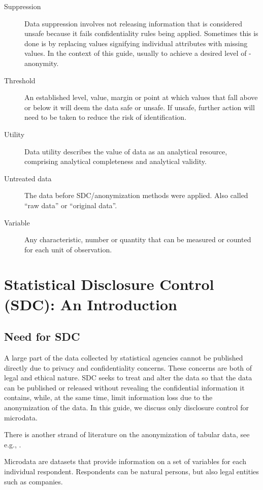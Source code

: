 \documentclass[letterpaper,10pt,english]{sphinxmanual}
\begin{document}
\begin{description}
\item[{Suppression}] \leavevmode
Data suppression involves not  releasing information that is  considered unsafe because it
fails confidentiality rules being applied. Sometimes this is done   is by replacing values
signifying individual attributes with missing values. In the context of this guide,
usually to achieve a  desired level of - anonymity.

\item[{Threshold}] \leavevmode
An established level, value,   margin or point at which values   that fall above or
below it will  deem the data safe or unsafe. If  unsafe, further action will need
to be taken to reduce the risk of identification.

\item[{Utility}] \leavevmode
Data utility describes the value  of data as an analytical  resource, comprising analytical
completeness and analytical validity.

\item[{Untreated data}] \leavevmode
The data before SDC/anonymization methods were applied. Also called “raw data” or “original data”.

\item[{Variable}] \leavevmode
Any characteristic, number or  quantity that can be measured or  counted for each unit of  observation.

\end{description}


\chapter{Statistical Disclosure Control (SDC): An Introduction}
\label{\detokenize{SDC_intro:statistical-disclosure-control-sdc-an-introduction}}\label{\detokenize{SDC_intro::doc}}

\section{Need for SDC}
\label{\detokenize{SDC_intro:need-for-sdc}}
A large part of the data collected by statistical agencies cannot be
published directly due to privacy and confidentiality concerns. These
concerns are both of legal and ethical nature. SDC seeks to treat and
alter the data so that the data can be published or released without
revealing the confidential information it contains, while, at the same
time, limit information loss due to the anonymization of the data. In
this guide, we discuss only disclosure control for
microdata. %
\begin{footnote}[1]\sphinxAtStartFootnote
There is another strand of literature on the anonymization of tabular
data, see e.g., {\hyperref[\detokenize{SDC_intro:hdfg12}]{}}.
%
\end{footnote} Microdata are datasets that provide
information on a set of variables for each individual respondent.
Respondents can be natural persons, but also legal entities such as
companies.
\end{document}
